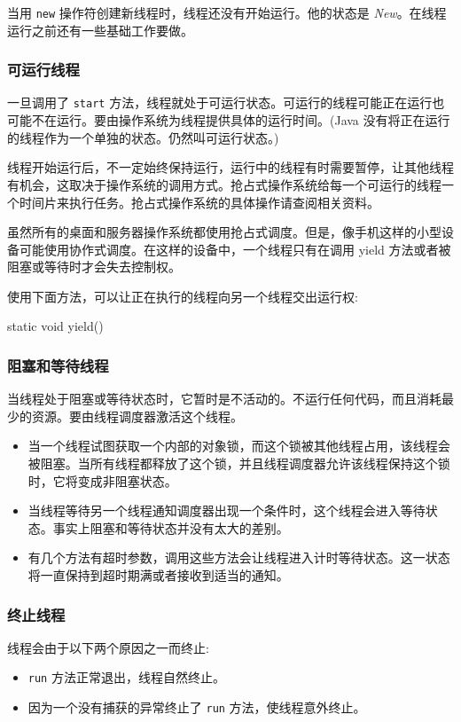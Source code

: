 当用 \texttt{new} 操作符创建新线程时，线程还没有开始运行。他的状态是 \textit{New}。在线程运行之前还有一些基础工作要做。

\subsubsection{可运行线程}

一旦调用了 \texttt{start} 方法，线程就处于可运行状态。可运行的线程可能正在运行也可能不在运行。要由操作系统为线程提供具体的运行时间。(Java 没有将正在运行的线程作为一个单独的状态。仍然叫可运行状态。)

线程开始运行后，不一定始终保持运行，运行中的线程有时需要暂停，让其他线程有机会，这取决于操作系统的调用方式。抢占式操作系统给每一个可运行的线程一个时间片来执行任务。抢占式操作系统的具体操作请查阅相关资料。

虽然所有的桌面和服务器操作系统都使用抢占式调度。但是，像手机这样的小型设备可能使用协作式调度。在这样的设备中，一个线程只有在调用 yield 方法或者被阻塞或等待时才会失去控制权。

使用下面方法，可以让正在执行的线程向另一个线程交出运行权:
\begin{Java}
static void yield()
\end{Java}

\subsubsection{阻塞和等待线程}

当线程处于阻塞或等待状态时，它暂时是不活动的。不运行任何代码，而且消耗最少的资源。要由线程调度器激活这个线程。
\begin{itemize}
    \item 当一个线程试图获取一个内部的对象锁，而这个锁被其他线程占用，该线程会被阻塞。当所有线程都释放了这个锁，并且线程调度器允许该线程保持这个锁时，它将变成非阻塞状态。
    \item 当线程等待另一个线程通知调度器出现一个条件时，这个线程会进入等待状态。事实上阻塞和等待状态并没有太大的差别。
    \item 有几个方法有超时参数，调用这些方法会让线程进入计时等待状态。这一状态将一直保持到超时期满或者接收到适当的通知。
\end{itemize}

\subsubsection{终止线程}

线程会由于以下两个原因之一而终止:
\begin{itemize}
    \item \texttt{run} 方法正常退出，线程自然终止。
    \item 因为一个没有捕获的异常终止了 \texttt{run} 方法，使线程意外终止。
\end{itemize}

